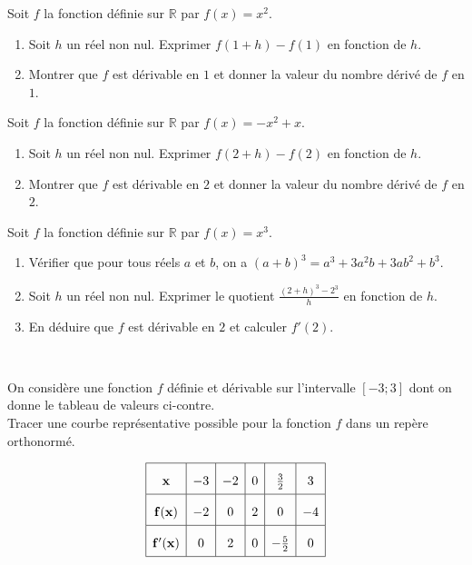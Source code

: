 \documentclass[11pt]{article}
\begin{document}
\newcommand{\Cf}{\mathscr{C}_f}


\begin{exo}
Soit $f$ la fonction définie sur $\mathbb{R}$ par
$f(x)=x^2$.
\begin{enumerate}
  \item Soit $h$ un réel non nul. Exprimer $f(1+h)-f(1)$ en fonction de $h$.
  \item Montrer que $f$ est dérivable en $1$ et donner la valeur du nombre
    dérivé de $f$ en $1$.
\end{enumerate}
\end{exo}

\begin{exo}
Soit $f$ la fonction définie sur $\mathbb{R}$ par
$f(x)=-x^2+x$.
\begin{enumerate}
  \item Soit $h$ un réel non nul. Exprimer $f(2+h)-f(2)$ en fonction de $h$.
  \item Montrer que $f$ est dérivable en $2$ et donner la valeur du nombre
    dérivé de $f$ en $2$.
\end{enumerate}
\end{exo}

\begin{exo}[$\star$]
Soit $f$ la fonction définie sur $\mathbb{R}$ par
$f(x)=x^3$.
\begin{enumerate}
  \item Vérifier que pour tous réels $a$ et $b$, on a
    $(a+b)^3=a^3+3a^2b+3ab^2+b^3$.
  \item Soit $h$ un réel non nul. Exprimer le quotient
    $\frac{(2+h)^3-2^3}{h}$ en fonction de $h$.
  \item En déduire que $f$ est dérivable en $2$ et calculer $f'(2)$.
\end{enumerate}
\end{exo}

\begin{exo}~\\[-5mm]
  \begin{minipage}[]{.6\textwidth}
On considère une fonction $f$ définie et dérivable sur
l'intervalle $\left[ -3; 3 \right]$ dont on donne le tableau de valeurs
ci-contre.\\
Tracer une courbe représentative possible pour la fonction $f$ dans un repère
orthonormé.
  \end{minipage}
  \begin{minipage}[]{.4\textwidth}
\[
  \def\arraystretch{2}
  \begin{array}{|c|c|c|c|c|c|}
    \hline
    \mathbf{x} & -3 & -2 & 0 & \frac{3}{2} & 3 \\
    \hline
    \mathbf{f(x)} & -2 & 0 & 2 & 0 & -4 \\
    \hline
    \mathbf{f'(x)} & 0 & 2 & 0 & -\frac{5}{2} & 0 \\
    \hline
  \end{array}
\]
  \end{minipage}
\end{exo}
\end{document}
